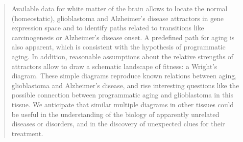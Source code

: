 \begin{quote}

{\large Available data for white matter of the brain allows to locate the normal (homeostatic), glioblastoma and Alzheimer’s disease attractors in gene expression space and to identify paths related to transitions like carcinogenesis or Alzheimer’s disease onset. A predefined path for aging is also apparent, which is consistent with the hypothesis of programmatic aging. In addition, reasonable assumptions about the relative strengths of attractors allow to draw a schematic landscape of fitness: a Wright’s diagram. These simple diagrams reproduce known relations between aging, glioblastoma and Alzheimer’s disease, and rise interesting questions like the possible connection between programmatic aging and glioblastoma in this tissue. We anticipate that similar multiple diagrams in other tissues could be useful in the understanding of the biology of apparently unrelated diseases or disorders, and in the discovery of unexpected clues for their treatment.
}


\end{quote}


\vfill
\cleardoublepage

